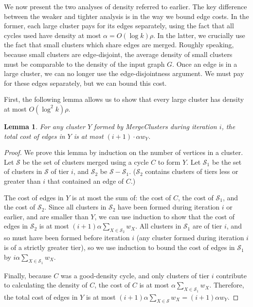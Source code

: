 \documentclass[11pt]{article}
\newtheorem{lemma}{Lemma}[section]
\newcommand{\script}[1]{\mathcal{#1}}
\begin{document}
\bigskip
We now present the two analyses of density referred to earlier. The
key difference between the weaker and tighter analysis is in the way
we bound edge costs. In the former, each large cluster pays for its
edges separately, using the fact that all cycles used have density at
most $\alpha = O(\log k) \rho$. In the latter, we crucially use the fact
that small clusters which share edges are merged. Roughly speaking,
because small clusters are edge-disjoint, the average density of small
clusters must be comparable to the density of the input graph
$G$. Once an edge is in a large cluster, we can no longer use the
edge-disjointness argument. We must pay for these edges separately,
but we can bound this cost.

First, the following lemma allows us to show that every large cluster
has density at most $O(\log^2 k) \rho$.

\begin{lemma} \label{lem:tierCost}
  For any cluster $Y$ formed by {\sc MergeClusters} during iteration $i$,
  the total cost of edges in $Y$ is at most $(i+1)\cdot \alpha w_Y$.
\end{lemma}
\begin{proof}
  We prove this lemma by induction on the number of vertices in a
  cluster.  Let $\script{S}$ be the set of clusters merged using a
  cycle $C$ to form $Y$.  Let $\script{S}_1$ be the set of clusters in
  $\script{S}$ of tier $i$, and $\script{S}_2$ be $\script{S} -
  \script{S}_1$. ($\script{S}_2$ contains clusters of tiers less or
  greater than $i$ that contained an edge of $C$.)

  The cost of edges in $Y$ is at most the sum of: the cost of $C$, the
  cost of $\script{S}_1$, and the cost of $\script{S}_2$. Since all
  clusters in $\script{S}_2$ have been formed during iteration $i$ or
  earlier, and are smaller than $Y$, we can use induction to show that
  the cost of edges in $\script{S}_2$ is at most $(i+1) \alpha \sum_{X
    \in \script{S}_2}w_X$. All clusters in $\script{S}_1$ are of tier
  $i$, and so must have been formed before iteration $i$ (any cluster
  formed during iteration $i$ is of a strictly greater tier), so we
  use induction to bound the cost of edges in $\script{S}_1$ by $i
  \alpha \sum_{X \in \script{S}_1} w_X$.

  Finally, because $C$ was a good-density cycle, and only clusters of
  tier $i$ contribute to calculating the density of $C$, the cost of
  $C$ is at most $\alpha \sum_{X \in \script{S}_1} w_X$. Therefore,
  the total cost of edges in $Y$ is at most $(i+1) \alpha \sum_{X \in
    \script{S}} w_X = (i+1) \alpha w_Y$.
\end{proof}
\end{document}

